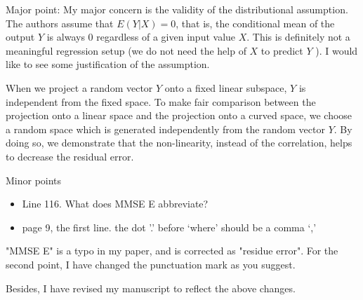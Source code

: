 \documentclass[answers]{exam}
\begin{document}
\pagestyle{empty}
\begin{questions}
\question
Major point:
My major concern is the validity of the distributional assumption.
The authors assume that $E(Y |X) = 0$,
that is, the conditional mean of the output $Y$
is always 0 regardless of a given input value $X$. This is definitely not a meaningful
regression setup (we do not need the help of $X$ to predict $Y$ ).
I would like to see
some justification of the assumption.
\begin{solution}
    When we project a random vector $Y$ onto a fixed linear subspace,
    $Y$ is independent from the fixed space.
    To make fair comparison between the projection onto a linear space and the projection onto
    a curved space, we choose a random space which is generated independently from the random vector
    $Y$. By doing so, we demonstrate that the non-linearity, instead of the correlation, helps to decrease the residual error.
\end{solution}
\question Minor points
\begin{itemize}
\item Line 116. What does MMSE E abbreviate?
\item page 9, the first line. the dot ’.’ before ‘where’ should be a comma ‘,’
\end{itemize}
\begin{solution}
    "MMSE E" is a typo in my paper, and is corrected as 
    "residue error".
    For the second point, I have changed the punctuation mark as you suggest.   
\end{solution}
\end{questions}
Besides, I have revised my manuscript to reflect the above changes.
\end{document}
